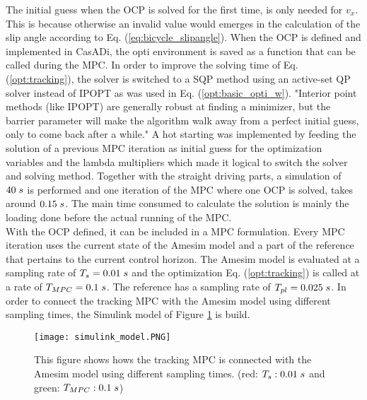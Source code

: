 The initial guess when the OCP is solved for the first time, is only needed for $v_x$. This is because otherwise an invalid value would emerges in the calculation of the slip angle according to Eq. (\ref{eq:bicycle_slipangle}). When the OCP is defined and implemented in CasADi, the opti environment is saved as a function that can be called during the MPC. In order to improve the solving time of Eq. (\ref{opt:tracking}), the solver is switched to a SQP method using an active-set QP solver instead of IPOPT as was used in Eq. (\ref{opt:basic_opti_w}). "Interior point methods (like IPOPT) are generally robust at finding a minimizer, but the barrier parameter will make the algorithm walk away from a perfect initial guess, only to come back after a while." \cite{Gillis2019} A hot starting was implemented by feeding the solution of a previous MPC iteration as initial guess for the optimization variables and the lambda multipliers which made it logical to switch the solver and solving method. Together with the straight driving parts, a simulation of $40\hspace{1mm}s$ is performed and one iteration of the MPC where one OCP is solved, takes around $0.15\hspace{1mm}s$. The main time consumed to calculate the solution is mainly the loading done before the actual running of the MPC.\\

With the OCP defined, it can be included in a MPC formulation. Every MPC iteration uses the current state of the Amesim model and a part of the reference that pertains to the current control horizon. The Amesim model is evaluated at a sampling rate of $T_s = 0.01 \hspace{1mm}s$ and the optimization Eq. (\ref{opt:tracking}) is called at a rate of $T_{MPC} = 0.1 \hspace{1mm}s$. The reference has a sampling rate of $T_{pl} = 0.025\hspace{1mm}s$. In order to connect the tracking MPC with the Amesim model using different sampling times, the Simulink model of Figure \ref{fig:simulink_model} is build. \\

\begin{figure}[h!]
	\centering
	\texttt{[image: simulink\_model.PNG]}
	\caption{This figure shows hows the tracking MPC is connected with the Amesim model using different sampling times. (red: $T_s: 0.01\hspace{1mm}s$ and green: $T_{MPC}:0.1\hspace{1mm}s$)}	
	\label{fig:simulink_model}
\end{figure}

